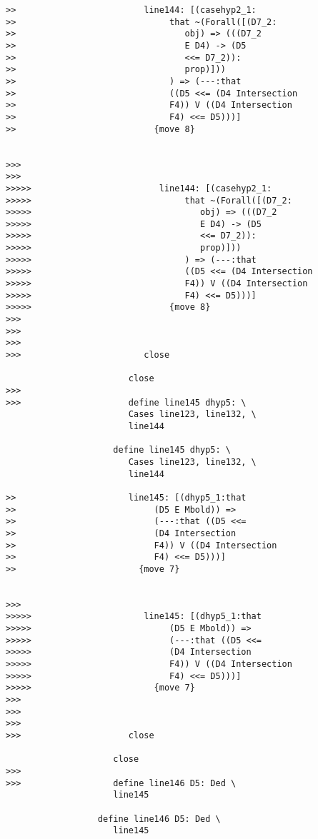 \documentclass[12pt]{article}
\begin{document}
\begin{verbatim}
>>                         line144: [(casehyp2_1:
>>                              that ~(Forall([(D7_2:
>>                                 obj) => (((D7_2
>>                                 E D4) -> (D5
>>                                 <<= D7_2)):
>>                                 prop)]))
>>                              ) => (---:that
>>                              ((D5 <<= (D4 Intersection
>>                              F4)) V ((D4 Intersection
>>                              F4) <<= D5)))]
>>                           {move 8}


>>>
>>>
>>>>>                         line144: [(casehyp2_1:
>>>>>                              that ~(Forall([(D7_2:
>>>>>                                 obj) => (((D7_2
>>>>>                                 E D4) -> (D5
>>>>>                                 <<= D7_2)):
>>>>>                                 prop)]))
>>>>>                              ) => (---:that
>>>>>                              ((D5 <<= (D4 Intersection
>>>>>                              F4)) V ((D4 Intersection
>>>>>                              F4) <<= D5)))]
>>>>>                           {move 8}
>>>
>>>
>>>
>>>                        close

                        close
>>>
>>>                     define line145 dhyp5: \
                        Cases line123, line132, \
                        line144

                     define line145 dhyp5: \
                        Cases line123, line132, \
                        line144

>>                      line145: [(dhyp5_1:that
>>                           (D5 E Mbold)) =>
>>                           (---:that ((D5 <<=
>>                           (D4 Intersection
>>                           F4)) V ((D4 Intersection
>>                           F4) <<= D5)))]
>>                        {move 7}


>>>
>>>>>                      line145: [(dhyp5_1:that
>>>>>                           (D5 E Mbold)) =>
>>>>>                           (---:that ((D5 <<=
>>>>>                           (D4 Intersection
>>>>>                           F4)) V ((D4 Intersection
>>>>>                           F4) <<= D5)))]
>>>>>                        {move 7}
>>>
>>>
>>>
>>>                     close

                     close
>>>
>>>                  define line146 D5: Ded \
                     line145

                  define line146 D5: Ded \
                     line145


\end{verbatim}
\end{document}

